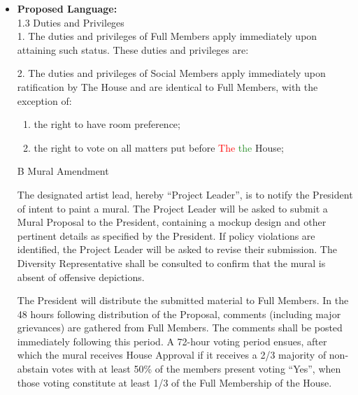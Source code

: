 \documentclass[10pt]{article} %
\newcommand{\add}[1]{\textcolor{ForestGreen}{#1}} %
\newcommand{\del}[1]{\textcolor{red}{#1}} %
\newcommand{\swap}[2]{\del{#1} \add{#2}} %
\begin{document}
\begin{itemize}
    \item \textbf{Proposed Language:} \\
        1.3 Duties and Privileges \\
        1. The duties and privileges of Full Members apply immediately upon attaining such status.
        These duties and privileges are:
        2. The duties and privileges of Social Members apply immediately upon ratification by The House and are identical to Full Members, with the exception of:
        \begin{enumerate}[label=(\alph*)]
            \item the right to have room preference;
            \item the right to vote on all matters put before \swap{The}{the} House;
        \end{enumerate}

        \color{ForestGreen} B Mural Amendment
        
        The designated artist lead, hereby ``Project Leader'', is to notify the President of intent to paint a mural. The Project Leader will be asked to submit a Mural Proposal to the President, containing a mockup design and other pertinent details as specified by the President. If policy violations are identified, the Project Leader will be asked to revise their submission. The Diversity Representative shall be consulted to confirm that the mural is absent of offensive depictions.
        
        The President will distribute the submitted material to Full Members. In the 48 hours following distribution of the Proposal, comments (including major grievances) are gathered from Full Members. The comments shall be posted immediately following this period. A 72-hour voting period ensues, after which the mural receives House Approval if it receives a 2/3 majority of non-abstain votes with at least 50\% of the members present voting ``Yes'', when those voting constitute at least 1/3 of the Full Membership of the House.
        

\end{itemize}
\end{document}
